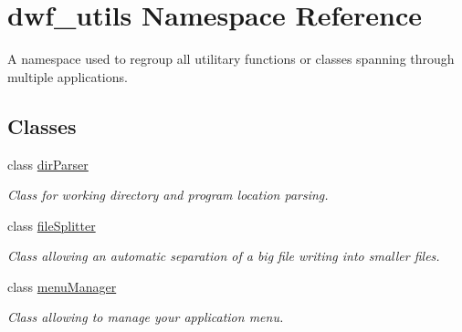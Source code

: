 \hypertarget{namespacedwf__utils}{\section{dwf\-\_\-utils \-Namespace \-Reference}
\label{namespacedwf__utils}
}


\-A namespace used to regroup all utilitary functions or classes spanning through multiple applications.  


\subsection*{\-Classes}
\begin{DoxyCompactItemize}
\item 
class \hyperlink{classdwf__utils_1_1dir_parser}{dir\-Parser}
\begin{DoxyCompactList}\small\item\em \-Class for working directory and program location parsing. \end{DoxyCompactList}\item 
class \hyperlink{classdwf__utils_1_1file_splitter}{file\-Splitter}
\begin{DoxyCompactList}\small\item\em \-Class allowing an automatic separation of a big file writing into smaller files. \end{DoxyCompactList}\item 
class \hyperlink{classdwf__utils_1_1menu_manager}{menu\-Manager}
\begin{DoxyCompactList}\small\item\em \-Class allowing to manage your application menu. \end{DoxyCompactList}\end{DoxyCompactItemize}
